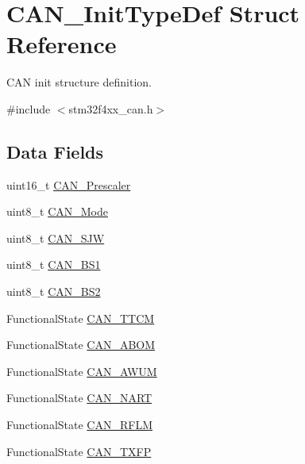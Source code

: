 \hypertarget{struct_c_a_n___init_type_def}{\section{C\-A\-N\-\_\-\-Init\-Type\-Def Struct Reference}
\label{struct_c_a_n___init_type_def}
}


C\-A\-N init structure definition.  




{\ttfamily \#include $<$stm32f4xx\-\_\-can.\-h$>$}

\subsection*{Data Fields}
\begin{DoxyCompactItemize}
\item 
uint16\-\_\-t \hyperlink{struct_c_a_n___init_type_def_abebaaf7d2ff24fcc501c5f39c00b8742}{C\-A\-N\-\_\-\-Prescaler}
\item 
uint8\-\_\-t \hyperlink{struct_c_a_n___init_type_def_ab06e41b2b56aa5aee6d27bdc07ca1bcf}{C\-A\-N\-\_\-\-Mode}
\item 
uint8\-\_\-t \hyperlink{struct_c_a_n___init_type_def_ad3a242b080dd6b9bda227520bf15a580}{C\-A\-N\-\_\-\-S\-J\-W}
\item 
uint8\-\_\-t \hyperlink{struct_c_a_n___init_type_def_a6244c64f0e5ff7fb26d8aefb272787c5}{C\-A\-N\-\_\-\-B\-S1}
\item 
uint8\-\_\-t \hyperlink{struct_c_a_n___init_type_def_a590ee9ab09e8c53d829444bdff407f1c}{C\-A\-N\-\_\-\-B\-S2}
\item 
Functional\-State \hyperlink{struct_c_a_n___init_type_def_ad3f995849aaf6dfbd79e0e70a37f28a9}{C\-A\-N\-\_\-\-T\-T\-C\-M}
\item 
Functional\-State \hyperlink{struct_c_a_n___init_type_def_a35b9420322c66febde319a638354e596}{C\-A\-N\-\_\-\-A\-B\-O\-M}
\item 
Functional\-State \hyperlink{struct_c_a_n___init_type_def_a8f5475c5b4c675c4662f62c23fd58097}{C\-A\-N\-\_\-\-A\-W\-U\-M}
\item 
Functional\-State \hyperlink{struct_c_a_n___init_type_def_ad956a58de0401d8bdd582b5f92c6fa82}{C\-A\-N\-\_\-\-N\-A\-R\-T}
\item 
Functional\-State \hyperlink{struct_c_a_n___init_type_def_a8e091965db871827fca02c636f42e3ac}{C\-A\-N\-\_\-\-R\-F\-L\-M}
\item 
Functional\-State \hyperlink{struct_c_a_n___init_type_def_a8f9c54b9a3f5663b482247a23d9cbf20}{C\-A\-N\-\_\-\-T\-X\-F\-P}
\end{DoxyCompactItemize}


